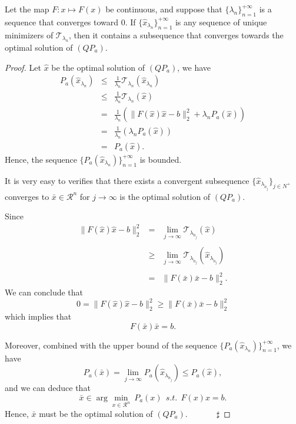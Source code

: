 \documentclass[smallextended]{svjour3}
\begin{document}
\begin{proposition}\label{pro1}
Let the map $F:x\mapsto F(x)$ be continuous, and suppose that $\{\lambda_{n}\}_{n=1}^{+\infty}$ is a sequence that converges
toward 0. If $\{\hat{x}_{\lambda_{n}}\}_{n=1}^{+\infty}$ is any sequence of unique minimizers of $\mathcal{T}_{\lambda_{n}}$, then it contains a
subsequence that converges towards the optimal solution of $(QP_{a})$.
\end{proposition}

\begin{proof}
Let $\hat{x}$ be the optimal solution of $(QP_{a})$, we have
\begin{eqnarray*}
P_{a}(\hat{x}_{\lambda_{n}})&\leq& \frac{1}{\lambda_{n}}\mathcal{T}_{\lambda_{n}}(\hat{x}_{\lambda_{n}})\\
&\leq&\frac{1}{\lambda_{n}}\mathcal{T}_{\lambda_{n}}(\hat{x})\\
&=&\frac{1}{\lambda_{n}}(\|F(\hat{x})\hat{x}-b\|_{2}^{2}+\lambda_{n} P_{a}(\hat{x}))\\
&=&\frac{1}{\lambda_{n}}(\lambda_{n} P_{a}(\hat{x}))\\
&=&P_{a}(\hat{x}).
\end{eqnarray*}
Hence, the sequence $\{P_{a}(\hat{x}_{\lambda_{n}})\}_{n=1}^{+\infty}$ is bounded.

It is very easy to verifies that there exists a convergent subsequence $\{\hat{x}_{\lambda_{\tilde{n}_{j}}}\}_{j\in N^{+}}$
converges to $\bar{x}\in \mathcal{R}^{n}$ for $j\rightarrow \infty$ is the optimal solution of $(QP_{a})$.

Since
\begin{equation}\label{r17}
\begin{array}{llll}
\|F(\hat{x})\hat{x}-b\|_{2}^{2}&=&\displaystyle\lim_{j\rightarrow\infty}\mathcal{T}_{\lambda_{\tilde{n}_{j}}}(\hat{x})\\\\
&\geq&\displaystyle\lim_{j\rightarrow\infty}\mathcal{T}_{\lambda_{\tilde{n}_{j}}}(\hat{x}_{\lambda_{\tilde{n}_{j}}})\\\\
&=&\|F(\bar{x})\bar{x}-b\|_{2}^{2}.
\end{array}
\end{equation}
We can conclude that
$$0=\|F(\hat{x})\hat{x}-b\|_{2}^{2}\geq\|F(\bar{x})\bar{x}-b\|_{2}^{2}$$
which implies that
\begin{equation}\label{r18}
F(\bar{x})\bar{x}=b.
\end{equation}

Moreover, combined with the upper bound of the sequence $\{P_{a}(\hat{x}_{\lambda_{n}})\}_{n=1}^{+\infty}$, we have
\begin{equation}\label{r19}
P_{a}(\bar{x})=\lim_{j\rightarrow\infty}P_{a}(\hat{x}_{\lambda_{\tilde{n}_{j}}})\leq P_{a}(\hat{x}),
\end{equation}
and we can deduce that
$$\bar{x}\in\arg\min_{x\in \mathcal{R}^{n}} \ P_{a}(x)\ \ s.t. \ \  F(x)x=b.$$
Hence, $\bar{x}$ must be the optimal solution of $(QP_{a})$.\ \ \ \ \ \ \ $\sharp$
\end{proof}
\end{document}
